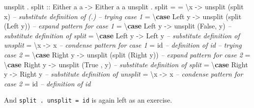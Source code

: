 \documentclass[]{article}
\newenvironment{Shaded}{}{}
\newcommand{\CommentTok}[1]{\textcolor[rgb]{0.38,0.63,0.69}{\textit{#1}}}
\newcommand{\DataTypeTok}[1]{\textcolor[rgb]{0.56,0.13,0.00}{#1}}
\newcommand{\FunctionTok}[1]{\textcolor[rgb]{0.02,0.16,0.49}{#1}}
\newcommand{\KeywordTok}[1]{\textcolor[rgb]{0.00,0.44,0.13}{\textbf{#1}}}
\newcommand{\NormalTok}[1]{#1}
\newcommand{\OtherTok}[1]{\textcolor[rgb]{0.00,0.44,0.13}{#1}}
\begin{document}
\begin{Shaded}
\begin{Highlighting}[]
\NormalTok{unsplit }\FunctionTok{.}\OtherTok{ split ::} \DataTypeTok{Either}\NormalTok{ a a }\OtherTok{->} \DataTypeTok{Either}\NormalTok{ a a}
\NormalTok{unsplit }\FunctionTok{.}\NormalTok{ split }\FunctionTok{=}
    \FunctionTok{=}\NormalTok{ \textbackslash{}x            }\OtherTok{->}\NormalTok{ unsplit (split x)          }\CommentTok{-- substitute definition of (.)}
      \CommentTok{-- trying case 1}
    \FunctionTok{=}\NormalTok{ \textbackslash{}}\KeywordTok{case} \DataTypeTok{Left}\NormalTok{  y }\OtherTok{->}\NormalTok{ unsplit (split (}\DataTypeTok{Left}\NormalTok{  y))  }\CommentTok{-- expand pattern for case 1}
    \FunctionTok{=}\NormalTok{ \textbackslash{}}\KeywordTok{case} \DataTypeTok{Left}\NormalTok{  y }\OtherTok{->}\NormalTok{ unsplit (}\DataTypeTok{False}\NormalTok{, y)         }\CommentTok{-- substitute definition of split}
    \FunctionTok{=}\NormalTok{ \textbackslash{}}\KeywordTok{case} \DataTypeTok{Left}\NormalTok{  y }\OtherTok{->} \DataTypeTok{Left}\NormalTok{  y                    }\CommentTok{-- substitute definition of unsplit}
    \FunctionTok{=}\NormalTok{ \textbackslash{}x            }\OtherTok{->}\NormalTok{ x                          }\CommentTok{-- condense pattern for case 1}
    \FunctionTok{=}\NormalTok{ id                                          }\CommentTok{-- definition of id}
      \CommentTok{-- trying case 2}
    \FunctionTok{=}\NormalTok{ \textbackslash{}}\KeywordTok{case} \DataTypeTok{Right}\NormalTok{ y }\OtherTok{->}\NormalTok{ unsplit (split (}\DataTypeTok{Right}\NormalTok{ y))  }\CommentTok{-- expand pattern for case 2}
    \FunctionTok{=}\NormalTok{ \textbackslash{}}\KeywordTok{case} \DataTypeTok{Right}\NormalTok{ y }\OtherTok{->}\NormalTok{ unsplit (}\DataTypeTok{True}\NormalTok{ , y)         }\CommentTok{-- substitute definition of split}
    \FunctionTok{=}\NormalTok{ \textbackslash{}}\KeywordTok{case} \DataTypeTok{Right}\NormalTok{ y }\OtherTok{->} \DataTypeTok{Right}\NormalTok{ y                    }\CommentTok{-- substitute definition of unsplit}
    \FunctionTok{=}\NormalTok{ \textbackslash{}x            }\OtherTok{->}\NormalTok{ x                          }\CommentTok{-- condense pattern for case 2}
    \FunctionTok{=}\NormalTok{ id                                          }\CommentTok{-- definition of id}
\end{Highlighting}
\end{Shaded}

And \texttt{split\ .\ unsplit\ =\ id} is again left as an exercise.
\end{document}
